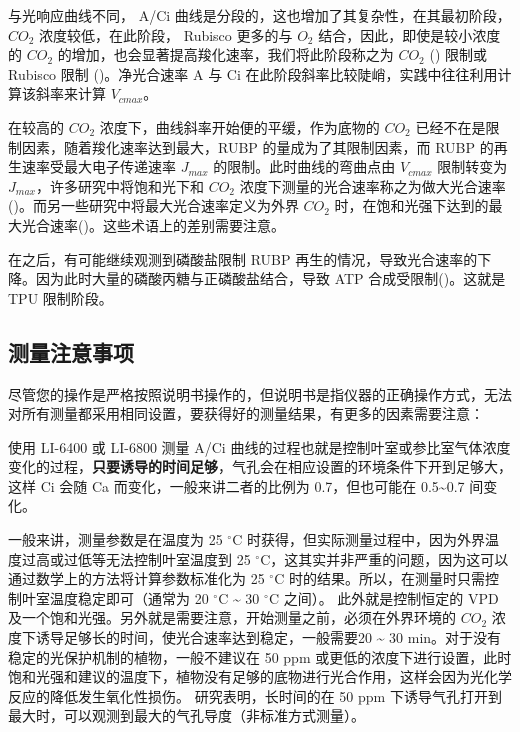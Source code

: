 \documentclass[
]{krantz}
\begin{document}
与光响应曲线不同， A/Ci 曲线是分段的，这也增加了其复杂性，在其最初阶段，\(CO_2\) 浓度较低，在此阶段， Rubisco 更多的与 \(O_2\) 结合，因此，即使是较小浓度的 \(CO_2\) 的增加，也会显著提高羧化速率，我们将此阶段称之为 \(CO_2\) (\citet{Wullschleger1993Biochemical}) 限制或 Rubisco 限制 (\citet{Long2003Gas})。净光合速率 A 与 Ci 在此阶段斜率比较陡峭，实践中往往利用计算该斜率来计算 \(V_{cmax}\)。

在较高的 \(CO_2\) 浓度下，曲线斜率开始便的平缓，作为底物的 \(CO_2\) 已经不在是限制因素，随着羧化速率达到最大，RUBP 的量成为了其限制因素，而 RUBP 的再生速率受最大电子传递速率 \(J_{max}\) 的限制。此时曲线的弯曲点由 \(V_{cmax}\) 限制转变为 \(J_{max}\)，许多研究中将饱和光下和 \(CO_2\) 浓度下测量的光合速率称之为做大光合速率(\citet{heath2005rising})。而另一些研究中将最大光合速率定义为外界 \(CO_2\) 时，在饱和光强下达到的最大光合速率(\citet{marshall1980a})。这些术语上的差别需要注意。

在之后，有可能继续观测到磷酸盐限制 RUBP 再生的情况，导致光合速率的下降。因为此时大量的磷酸丙糖与正磷酸盐结合，导致 ATP 合成受限制(\citet{ellsworth2015phosphorus})。这就是 TPU 限制阶段。

\hypertarget{note_detail}{%
\subsection{测量注意事项}\label{note_detail}}

尽管您的操作是严格按照说明书操作的，但说明书是指仪器的正确操作方式，无法对所有测量都采用相同设置，要获得好的测量结果，有更多的因素需要注意：

使用 LI-6400 或 LI-6800 测量 A/Ci 曲线的过程也就是控制叶室或参比室气体浓度变化的过程，\textbf{只要诱导的时间足够}，气孔会在相应设置的环境条件下开到足够大，这样 Ci 会随 Ca 而变化，一般来讲二者的比例为 0.7，但也可能在 0.5\textasciitilde0.7 间变化。

一般来讲，测量参数是在温度为 25 \(^{\circ}\)C 时获得，但实际测量过程中，因为外界温度过高或过低等无法控制叶室温度到 25 \(^{\circ}\)C，这其实并非严重的问题，因为这可以通过数学上的方法将计算参数标准化为 25 \(^{\circ}\)C 时的结果。所以，在测量时只需控制叶室温度稳定即可（通常为 20 \(^{\circ}\)C \textasciitilde{} 30 \(^{\circ}\)C 之间）。 此外就是控制恒定的 VPD 及一个饱和光强。另外就是需要注意，开始测量之前，必须在外界环境的 \(CO_2\) 浓度下诱导足够长的时间，使光合速率达到稳定，一般需要20 \textasciitilde{} 30 min。对于没有稳定的光保护机制的植物，一般不建议在 50 ppm 或更低的浓度下进行设置，此时饱和光强和建议的温度下，植物没有足够的底物进行光合作用，这样会因为光化学反应的降低发生氧化性损伤。\citet{centritto2003} 研究表明，长时间的在 50 ppm 下诱导气孔打开到最大时，可以观测到最大的气孔导度（非标准方式测量）。
\end{document}
